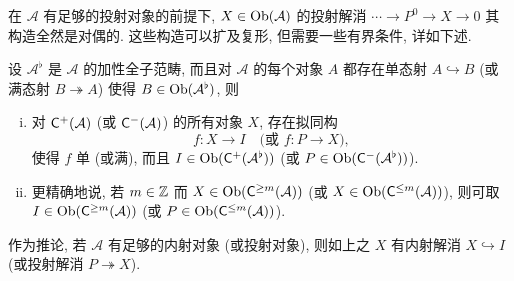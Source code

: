 在 $\mathcal{A}$ 有足够的投射对象的前提下, $X \in \operatorname{Ob}(\mathcal{A})$ 的投射解消 $\cdots \to P^0 \to X \to 0$ 其构造全然是对偶的. 这些构造可以扩及复形, 但需要一些有界条件, 详如下述.

\begin{theorem}\label{prop:resolution-existence}
	设 $\mathcal{A}^\flat$ 是 $\mathcal{A}$ 的加性全子范畴, 而且对 $\mathcal{A}$ 的每个对象 $A$ 都存在单态射 $A \hookrightarrow B$ (或满态射 $B \twoheadrightarrow A$) 使得 $B \in \operatorname{Ob}(\mathcal{A}^\flat)$, 则
	\begin{enumerate}[(i)]
		\item 对 $\mathsf{C}^+(\mathcal{A})$ (或 $\mathsf{C}^-(\mathcal{A})$) 的所有对象 $X$, 存在拟同构
		\[ f: X \to I \quad \text{(或 $f: P \to X$)}, \]
		使得 $f$ 单 (或满), 而且 $I \in \operatorname{Ob}(\mathsf{C}^+(\mathcal{A}^\flat))$ (或 $P \in \operatorname{Ob}(\mathsf{C}^-(\mathcal{A}^\flat))$).
		\item 更精确地说, 若 $m \in \mathbb{Z}$ 而 $X \in \operatorname{Ob}(\mathsf{C}^{\geq m}(\mathcal{A}))$ (或 $X \in \operatorname{Ob}(\mathsf{C}^{\leq m}(\mathcal{A}))$), 则可取 $I \in \operatorname{Ob}(\mathsf{C}^{\geq m}(\mathcal{A}))$ (或 $P \in \operatorname{Ob}(\mathsf{C}^{\leq m}(\mathcal{A}))$).
	\end{enumerate}

	作为推论, 若 $\mathcal{A}$ 有足够的内射对象 (或投射对象), 则如上之 $X$ 有内射解消 $X \hookrightarrow I$ (或投射解消 $P \twoheadrightarrow X$).
\end{theorem}
